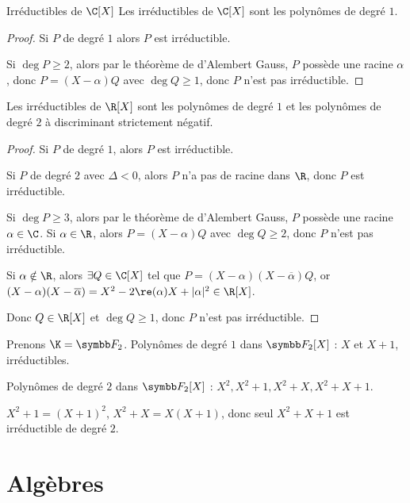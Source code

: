 \begin{theoreme}{Irréductibles de $\C[X]$}{}
    Les irréductibles de $\C[X]$ sont les polynômes de degré $1$.
\end{theoreme}

\begin{proof}
    Si $P$ de degré $1$ alors $P$ est irréductible.

    Si $\deg P \geqslant 2$, alors par le théorème de d'Alembert Gauss, 
    $P$ possède une racine $\alpha$, donc $P = (X - \alpha) Q$ avec $\deg Q \geqslant 1$, donc
    $P$ n'est pas irréductible.
\end{proof}

\begin{theoreme}{}{}
    Les irréductibles de $\R[X]$ sont les polynômes de degré $1$ et les polynômes
    de degré $2$ à discriminant strictement négatif.
\end{theoreme}

\begin{proof}
    Si $P$ de degré $1$, alors $P$ est irréductible.

    \avspace Si $P$ de degré $2$ avec $\Delta < 0$, alors $P$ n'a pas de racine dans $\R$, donc 
    $P$ est irréductible.

    \avspace Si $\deg P \geqslant 3$, alors par le théorème de d'Alembert Gauss, 
    $P$ possède une racine $\alpha \in \C$. Si $\alpha \in \R$, alors $P = (X - \alpha) Q$ avec $\deg Q \geqslant 2$, donc
    $P$ n'est pas irréductible.

    Si $\alpha \notin \R$, alors $\exists Q \in \C[X]$ tel que $P = (X - \alpha)(X - \overline \alpha) Q$, 
    or $(X - \alpha)(X - \overline \alpha) = X^2 - 2 \re(\alpha) X + |\alpha|^2 \in \R[X]$.

    Donc $Q \in \R[X]$ et $\deg Q \geqslant 1$, donc $P$ n'est pas irréductible.
\end{proof}

\begin{exemple}
    Prenons $\K = \symbb F_2$. Polynômes de degré $1$ dans $\symbb F_2[X]$ : $X$ et $X + 1$, irréductibles.

    Polynômes de degré $2$ dans $\symbb F_2[X]$ : $X^2, X^2 + 1, X^2 + X, X^2 + X + 1$.

    $X^2 + 1 = (X + 1)^2$, $X^2 + X = X(X + 1)$, donc seul $X^2 + X + 1$ est irréductible de degré $2$.
\end{exemple}

\section{Algèbres} 
